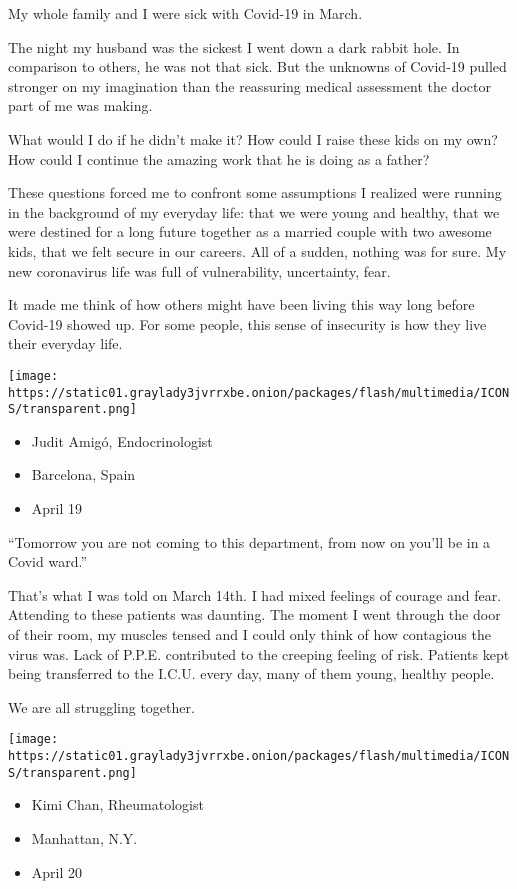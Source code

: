 My whole family and I were sick with Covid-19 in March.

The night my husband was the sickest I went down a dark rabbit hole. In
comparison to others, he was not that sick. But the unknowns of Covid-19
pulled stronger on my imagination than the reassuring medical assessment
the doctor part of me was making.

What would I do if he didn't make it? How could I raise these kids on my
own? How could I continue the amazing work that he is doing as a father?

These questions forced me to confront some assumptions I realized were
running in the background of my everyday life: that we were young and
healthy, that we were destined for a long future together as a married
couple with two awesome kids, that we felt secure in our careers. All of
a sudden, nothing was for sure. My new coronavirus life was full of
vulnerability, uncertainty, fear.

It made me think of how others might have been living this way long
before Covid-19 showed up. For some people, this sense of insecurity is
how they live their everyday life.

\texttt{[image: https://static01.graylady3jvrrxbe.onion/packages/flash/multimedia/ICONS/transparent.png]}

\begin{itemize}
\tightlist
\item
  Judit Amigó, Endocrinologist
\item
  Barcelona, Spain
\item
  April 19
\end{itemize}

``Tomorrow you are not coming to this department, from now on you'll be
in a Covid ward.''

That's what I was told on March 14th. I had mixed feelings of courage
and fear. Attending to these patients was daunting. The moment I went
through the door of their room, my muscles tensed and I could only think
of how contagious the virus was. Lack of P.P.E. contributed to the
creeping feeling of risk. Patients kept being transferred to the I.C.U.
every day, many of them young, healthy people.

We are all struggling together.

\texttt{[image: https://static01.graylady3jvrrxbe.onion/packages/flash/multimedia/ICONS/transparent.png]}

\begin{itemize}
\tightlist
\item
  Kimi Chan, Rheumatologist
\item
  Manhattan, N.Y.
\item
  April 20
\end{itemize}

